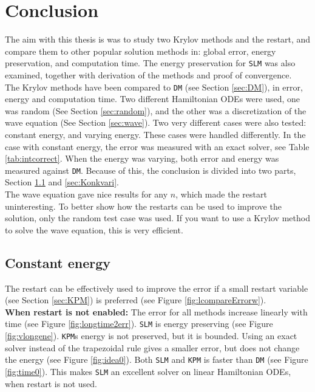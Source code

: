 \chapter{ Conclusion }

\noindent The aim with this thesis is was to study two Krylov methods and the restart, and compare them to other popular solution methods in: 
global error, energy preservation, and computation time. The energy preservation for \texttt{SLM} was also examined, together with derivation of the methods and proof of convergence. \\

\noindent The Krylov methods have been compared to \texttt{DM} (see Section \ref{sec:DM}), in error, energy and computation time. Two different Hamiltonian ODEs were used, one was random (See Section \ref{sec:random}), and the other was a discretization of the wave equation (See Section \ref{sec:wave}). Two very different cases were also tested: constant energy, and varying energy. These cases were handled differently. In the case with constant energy, the error was measured with an exact solver, see Table \ref{tab:intcorrect}. When the energy was varying, both error and energy was measured against \texttt{DM}. Because of this, the conclusion is divided into two parts, Section \ref{sec:Konkconst} and \ref{sec:Konkvari}. \\

\noindent The wave equation gave nice results for any $n$, which made the restart uninteresting. To better show how the restarts can be used to improve the solution, only the random test case was used. If you want to use a Krylov method to solve the wave equation, this is very efficient.

\section{Constant energy} %
\label{sec:Konkconst}
The restart can be effectively used to improve the error if a small restart variable (see Section \ref{sec:KPM}) is preferred (see Figure \ref{fig:lcompareErrorw}). \\

\noindent \textbf{When restart is not enabled:} The error for all methods increase linearly with time (see Figure \ref{fig:longtime2err}). \texttt{SLM} is energy preserving (see Figure \ref{fig:vlongene}). \texttt{KPM}s energy is not preserved, but it is bounded. Using an  exact solver instead of the trapezoidal rule gives a smaller error, but does not change the energy (see Figure \ref{fig:idea0}). Both \texttt{SLM} and \texttt{KPM} is faster than \texttt{DM} (see Figure \ref{fig:time0}). This makes \texttt{SLM} an excellent solver on linear Hamiltonian ODEs, when restart is not used.\\

